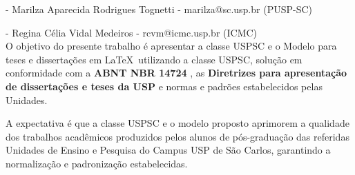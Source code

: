 	 - Marilza Aparecida Rodrigues Tognetti - marilza@sc.usp.br (PUSP-SC)
	
	 - Regina Célia Vidal Medeiros - rcvm@icmc.usp.br (ICMC) \\
	
	O objetivo do presente trabalho é apresentar a classe USPSC e o Modelo para teses e dissertações em \LaTeX\ utilizando a classe USPSC, solução em conformidade com a \textbf{ABNT NBR 14724} \cite{nbr14724}, as \textbf{Diretrizes para apresentação de dissertações e teses da USP} \cite{sibi2009} e normas e padrões estabelecidos pelas Unidades. 
	
	A expectativa é que a classe USPSC e o modelo proposto aprimorem a qualidade dos trabalhos acadêmicos produzidos pelos alunos de pós-graduação das referidas Unidades de Ensino e Pesquisa do Campus USP de São Carlos, garantindo a normalização e padronização estabelecidas.
	
	
